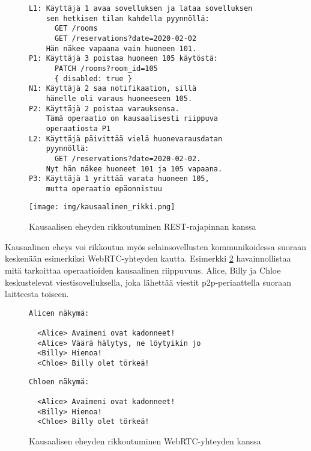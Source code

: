\documentclass[finnish,twoside,censored,csm,sw-track-2018]{HYthesisML}
\begin{document}
\vspace{3mm}
\begin{figure}[ht]
\begin{minipage}{.45\textwidth}
  \begin{Verbatim}[fontsize=\scriptsize]
L1: Käyttäjä 1 avaa sovelluksen ja lataa sovelluksen
    sen hetkisen tilan kahdella pyynnöllä:
      GET /rooms
      GET /reservations?date=2020-02-02
    Hän näkee vapaana vain huoneen 101.
P1: Käyttäjä 3 poistaa huoneen 105 käytöstä:
      PATCH /rooms?room_id=105
      { disabled: true }
N1: Käyttäjä 2 saa notifikaation, sillä
    hänelle oli varaus huoneeseen 105.
P2: Käyttäjä 2 poistaa varauksensa.
    Tämä operaatio on kausaalisesti riippuva
    operaatiosta P1
L2: Käyttäjä päivittää vielä huonevarausdatan
    pyynnöllä:
      GET /reservations?date=2020-02-02.
    Nyt hän näkee huoneet 101 ja 105 vapaana.
P3: Käyttäjä 1 yrittää varata huoneen 105,
    mutta operaatio epäonnistuu
\end{Verbatim}
\end{minipage}%
\begin{minipage}{.55\textwidth}
  \begin{center}
    \texttt{[image: img/kausaalinen\_rikki.png]}
  \end{center}
\end{minipage}%
\caption{Kausaalisen eheyden rikkoutuminen REST-rajapinnan kanssa}
\label{fig-kausaalinen-rest}
\end{figure}

Kausaalinen eheys voi rikkoutua myös selainsovellusten kommunikoidessa suoraan keskenään esimerkiksi WebRTC-yhteyden kautta. Esimerkki \ref{fig-kausaalinen-webrtc} havainnollistaa mitä tarkoittaa operaatioiden kausaalinen riippuvuus. Alice, Billy ja Chloe keskustelevat viestisovelluksella, joka lähettää viestit p2p-periaattella suoraan laitteesta toiseen.

\vspace{3mm}

\begin{figure}[ht]
\begin{minipage}{0.5\textwidth}
  \begin{Verbatim}[fontsize=\footnotesize]
  Alicen näkymä:
  
  <Alice> Avaimeni ovat kadonneet!
  <Alice> Väärä hälytys, ne löytyikin jo
  <Billy> Hienoa!
  <Chloe> Billy olet törkeä!
  \end{Verbatim}
\end{minipage}%
\begin{minipage}{0.5\textwidth}
\begin{Verbatim}[fontsize=\footnotesize]
  Chloen näkymä:
  
  <Alice> Avaimeni ovat kadonneet!
  <Billy> Hienoa!
  <Chloe> Billy olet törkeä!

\end{Verbatim}
\end{minipage}
\caption{Kausaalisen eheyden rikkoutuminen WebRTC-yhteyden kanssa}
\label{fig-kausaalinen-webrtc}
\end{figure}
\end{document}
